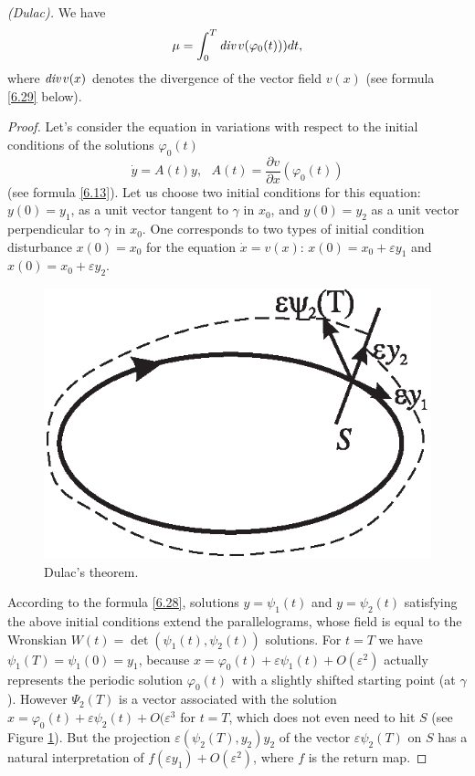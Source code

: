 \begin{theorem}\emph{(Dulac).}
	We have
	$$
	\mu =\int_{0}^{T}\emph{div\,}v(\varphi _{0}(t)))dt,
	$$
	where $\emph{div\,}v(x)$ denotes the divergence of the vector field $ v (x) $ (see formula \eqref{6.29} below).
	\begin{proof}
		Let's consider the equation in variations with respect to the initial conditions of the solutions $\varphi
		_{0}(t) $%
		$$
		\dot{y}=A(t)y,\text{ \ \ \ }A(t)=\frac{\partial v}{\partial x}(\varphi
		_{0}(t))
		$$
		(see formula \eqref{6.13}). Let us choose two initial conditions for this equation: $ y (0) = y_ {1} $, as a unit vector tangent to $ \gamma $ in $ x_ {0} $, and $ y (0) = y_ {2}$ as a unit vector perpendicular to $ \gamma $ in $ x_ {0} $. One corresponds to two types of initial condition disturbance $ x (0) = x_ {0} $ for the equation $ \dot {x} = v (x)$: $x (0) = x_ {0} + \varepsilon y_ {1} $ and $ x (0) = x_ {0} + \varepsilon y_ {2} $.
		
		\begin{figure}[!ht]
			\centering
			\includegraphics [scale=1]{jtr212}
			\caption{Dulac's theorem.}
			\label{fig:2.12}
		\end{figure}
	
		According to the formula \eqref{6.28}, solutions $y=\psi _{1}(t)$ and $y=\psi _{2}(t)$ satisfying the above initial conditions extend the parallelograms, whose field is equal to the Wronskian $W(t)=\det \left( \psi _{1}(t),\psi _{2}(t)\right) $ solutions. For $t=T$ we have $\psi _{1}(T)=\psi _{1}(0)=y_{1}$, because $x=\varphi _{0}(t)+\varepsilon
		\psi _{1}(t)+O(\varepsilon ^{2})$ actually represents the periodic solution $ \varphi _{0} (t) $ with a slightly shifted starting point (at $ \gamma$). However $ \Psi _ {2} (T) $ is a vector associated with the solution $ x = \varphi _ {0} (t) + \varepsilon \psi_ {2} (t) + O (\varepsilon ^ {3} $ for $ t = T $, which does not even need to hit $S$ (see Figure \ref{fig:2.12}). But the projection $\varepsilon (\psi
		_{2}(T),y_{2})y_{2}$ of the vector $\varepsilon \psi _{2}(T)$ on $ S $ has a natural interpretation of $ f (\varepsilon y_ {1}) + O (\varepsilon ^ {2}) $, where $ f $ is the return map.
		

\end{proof}
\end{theorem}
